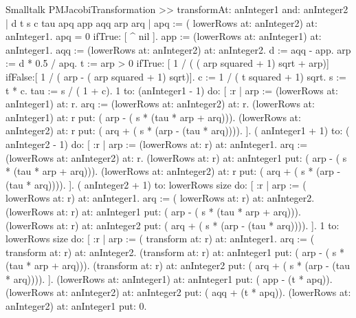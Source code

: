 
\begin{displaycode}{Smalltalk}
PMJacobiTransformation >> transformAt: anInteger1 and: anInteger2
    | d t s c tau apq app aqq arp arq |
    apq := ( lowerRows at: anInteger2) at: anInteger1.
    apq = 0
        ifTrue: [ ^ nil ].
    app := (lowerRows at: anInteger1) at: anInteger1.
    aqq := (lowerRows at: anInteger2) at: anInteger2.
    d := aqq - app.
    arp := d * 0.5 / apq.
    t := arp > 0 
        ifTrue: [ 1 / ( ( arp squared + 1) sqrt + arp)]
        ifFalse:[ 1 / ( arp - ( arp squared + 1) sqrt)].
    c := 1 / ( t squared + 1) sqrt.
    s := t * c.
    tau := s / ( 1 + c).
    1 to: (anInteger1 - 1)
        do: [ :r |
              arp := (lowerRows at: anInteger1) at: r.
              arq := (lowerRows at: anInteger2) at: r.
              (lowerRows at: anInteger1) at: r put: ( arp - ( s * 
                                                  (tau * arp + arq))).
              (lowerRows at: anInteger2) at: r put: ( arq + ( s * 
                                                (arp - (tau * arq)))).
            ].
    ( anInteger1 + 1) to: ( anInteger2 - 1)
        do: [ :r |
              arp := (lowerRows at: r) at: anInteger1.
              arq := (lowerRows at: anInteger2) at: r.
              (lowerRows at: r) at: anInteger1 put: ( arp - ( s * 
                                                  (tau * arp + arq))).
              (lowerRows at: anInteger2) at: r put: ( arq + ( s * 
                                                (arp - (tau * arq)))).
            ].
    ( anInteger2 + 1) to: lowerRows size
        do: [ :r |
              arp := ( lowerRows at: r) at: anInteger1.
              arq := ( lowerRows at: r) at: anInteger2.
              (lowerRows at: r) at: anInteger1 put: ( arp - ( s * 
                                                  (tau * arp + arq))).
              (lowerRows at: r) at: anInteger2 put: ( arq + ( s * 
                                                (arp - (tau * arq)))).
            ].
    1 to: lowerRows size
        do: [ :r |
              arp := ( transform at: r) at: anInteger1.
              arq := ( transform at: r) at: anInteger2.
              (transform at: r) at: anInteger1 put: ( arp - ( s * 
                                                  (tau * arp + arq))).
              (transform at: r) at: anInteger2 put: ( arq + ( s * 
                                                (arp - (tau * arq)))).
            ].
    (lowerRows at: anInteger1) at: anInteger1 put: ( app - (t * 
                                                                apq)).
    (lowerRows at: anInteger2) at: anInteger2 put: ( aqq + (t * 
                                                                apq)).
    (lowerRows at: anInteger2) at: anInteger1 put: 0.
\end{displaycode}

